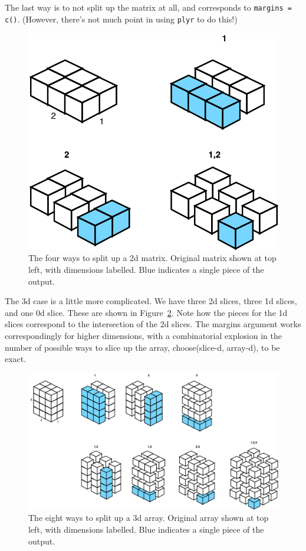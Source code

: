\documentclass[letterpage]{scrartcl}
\newcommand{\code}[1]{\lstinline!#1!}
\begin{document}
\noindent The last way is to not split up the matrix at all, and corresponds to \code{margins = c()}.  (However, there's not much point in using {\tt plyr} to do this!)

\begin{figure}[htbp]
  \centering
    \includegraphics[width= 0.35 \textwidth]{split-matrix}
  \caption{The four ways to split up a 2d matrix.  Original matrix shown at top left, with dimensions labelled.  Blue indicates a single piece of the output.}
  \label{fig:split-matrix}
\end{figure}

The 3d case is a little more complicated.  We have three 2d slices, three 1d slices, and one 0d slice.  These are shown in Figure~\ref{fig:split-array}.  Note how the pieces for the 1d slices correspond to the intersection of the 2d slices.  The margins argument works correspondingly for higher dimensions, with a combinatorial explosion in the number of possible ways to slice up the array, choose(slice-d, array-d), to be exact.

\begin{figure}[htbp]
  \centering
    \includegraphics[width= \textwidth]{split-array}
  \caption{The eight ways to split up a 3d array.  Original array shown at top left, with dimensions labelled.  Blue indicates a single piece of the output.}
  \label{fig:split-array}
\end{figure}
\end{document}
